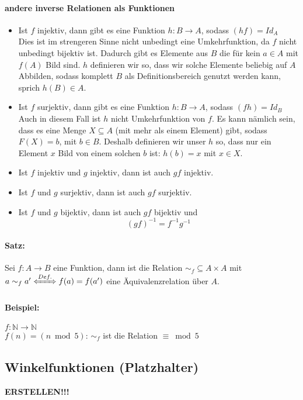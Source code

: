 \paragraph{andere inverse Relationen als Funktionen}
\begin{itemize}
\item Ist $f$ injektiv, dann gibt es eine Funktion $h:B\rightarrow A$, sodass $(hf)=Id_A$\\
Dies ist im strengeren Sinne nicht unbedingt eine Umkehrfunktion, da $f$ nicht unbedingt bijektiv ist. Dadurch gibt es Elemente aus $B$ die für kein $a\in A$ mit $f(A)$ Bild sind.
$h$ definieren wir so, dass wir solche Elemente beliebig auf $A$ Abbilden, sodass komplett $B$ als Definitionsbereich genutzt werden kann, sprich $h(B)\in A$.
\item Ist $f$ surjektiv, dann gibt es eine Funktion $h:B\rightarrow A$, sodass $(fh)=Id_B$\\
Auch in diesem Fall ist $h$ nicht Umkehrfunktion von $f$. Es kann nämlich sein, dass es eine Menge $X\subseteq A$ (mit mehr als einem Element) gibt, sodass $F(X)=b$, mit $b\in B$.
Deshalb definieren wir unser $h$ so, dass nur ein Element $x$ Bild von einem solchen $b$ ist: $h(b)=x$ mit $x\in X$.
\item Ist $f$ injektiv und $g$ injektiv, dann ist auch $gf$ injektiv.
\item Ist $f$ und $g$ surjektiv, dann ist auch $gf$ surjektiv.
\item Ist $f$ und $g$ bijektiv, dann ist auch $gf$ bijektiv und
\[
(gf)^{-1}=f^{-1}g^{-1}
\]
\end{itemize}

\paragraph{Satz:}Sei $f:A\rightarrow B$ eine Funktion, dann ist die Relation $\sim_f\subseteq A\times A$ mit $a\sim_f a' \xLeftrightarrow{Def.} f(a)=f(a')$ eine Äquivalenzrelation über $A$.
\paragraph{Beispiel:}$f:\mathbb{N}\rightarrow\mathbb{N}$\\
$f(n)=(n \bmod 5)$: $\sim_f$ ist die Relation $\equiv \bmod 5$

\subsection{Winkelfunktionen (Platzhalter)}
\textbf{ERSTELLEN!!!}
